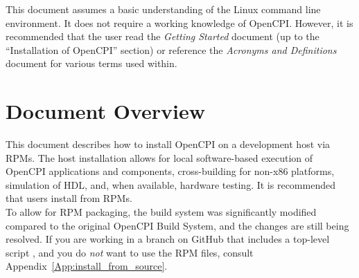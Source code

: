 This document assumes a basic understanding of the Linux command line environment. It does not require a working knowledge of OpenCPI. However, it is recommended that the user read the \textit{Getting Started} document (up to the ``Installation of OpenCPI'' section) or reference the \textit{Acronyms and Definitions} document for various terms used within.
\def\refskipig{} %
\def\myreferences{
\hline
Installation Guide\footnote{The RPM installation process is quite different from the process explained in the OpenCPI Installation Guide, but the OpenCPI Installation guide has applicable post-installation information for PCI-based boards, etc.}
& OpenCPI & \url{https://goo.gl/VWo2jX} \\
\hline
Component Development Guide & OpenCPI & \url{https://goo.gl/zBwIe0} \\
\hline
RCC Development Guide & OpenCPI & \url{https://goo.gl/0ix1E0} \\
\hline
HDL Development Guide & OpenCPI & \url{https://goo.gl/OVmRhI} \\
\hline
FPGA Vendor Tools Installation Guide & ANGRYVIPER & \path{FPGA_Vendor_Tools_Installation_Guide.pdf} \\
\hline
Managing Software with \texttt{yum} & CentOS Project &  \url{https://www.centos.org/docs/5/html/yum/} \\
\hline
CentOS Deployment Guide: Useful \texttt{yum} commands (\textit{e.g.} \texttt{yum localinstall}) & CentOS Project &  \url{https://www.centos.org/docs/5/html/5.2/Deployment_Guide/s1-yum-useful-commands.html} \\
}

\newpage
\section{Document Overview}
\label{sec:doc_overview}
This document describes how to install OpenCPI on a development host via RPMs. The host installation allows for local software-based execution of OpenCPI applications and components, cross-building for non-x86 platforms, simulation of HDL, and, when available, hardware testing. It is recommended that users install from RPMs.\\

To allow for RPM packaging, the build system was significantly modified compared to the original OpenCPI Build System, and the changes are still being resolved. If you are working in a branch on GitHub that includes a top-level script , and you do \textit{not} want to use the RPM files, consult Appendix~\ref{App:install_from_source}.\\

